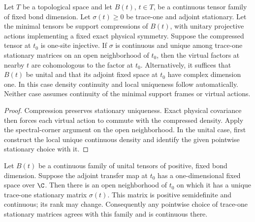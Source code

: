 \begin{lemma}
    \label{thm:spt_local_unique_stationary_class}
    \leanok
    Let $T$ be a topological space and let $B(t)$, $t\in T$, be a
    continuous tensor family of fixed bond dimension. Let
    $\sigma(t)\geq0$ be trace-one and adjoint stationary.
    Let the minimal tensors be support compressions of $B(t)$,
    with unitary projective actions implementing a fixed exact physical
    symmetry. Suppose the compressed tensor at $t_0$ is one-site injective.
    If $\sigma$ is continuous and unique among trace-one stationary
    matrices on an open neighborhood of $t_0$, then the virtual factors
    at nearby $t$ are cohomologous to the factor at $t_0$.
    Alternatively, it suffices that $B(t)$ be unital and that its adjoint
    fixed space at $t_0$ have complex dimension one. In this case density
    continuity and local uniqueness follow automatically. Neither case
    assumes continuity of the minimal support frames or virtual actions.
\end{lemma}

\begin{proof}\leanok
    Compression preserves stationary uniqueness. Exact physical covariance
    then forces each virtual action to commute with the compressed
    density. Apply the spectral-corner argument on the open neighborhood.
    In the unital case, first construct the local unique continuous
    density and identify the given pointwise stationary choice with it.
\end{proof}

\begin{lemma}
    \label{thm:spt_local_stationary_density}
    \leanok
    Let $B(t)$ be a continuous family of unital tensors of positive,
    fixed bond dimension. Suppose the adjoint transfer map at $t_0$
    has a one-dimensional fixed space over $\C$. Then there is an open
    neighborhood of $t_0$ on which it has a unique trace-one stationary
    matrix $\sigma(t)$. This matrix is positive semidefinite and continuous;
    its rank may change. Consequently any pointwise choice of trace-one
    stationary matrices agrees with this family and is continuous there.
\end{lemma}

